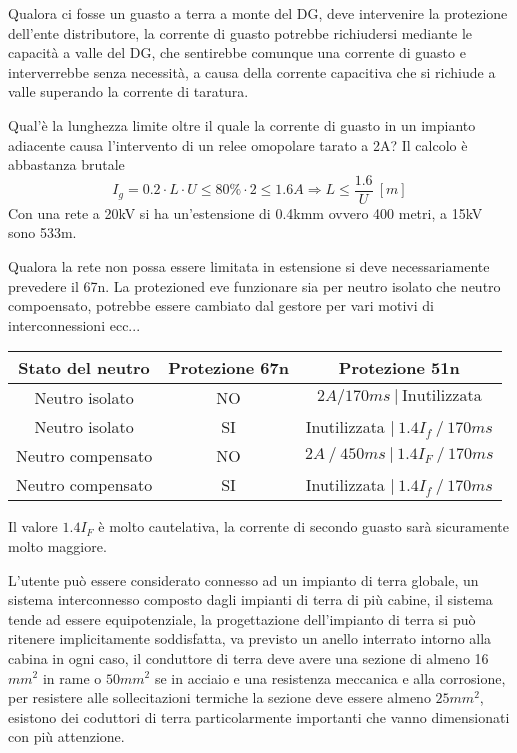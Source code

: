 Qualora ci fosse un guasto a terra a monte del DG, deve intervenire la 
protezione dell'ente distributore, la corrente di guasto potrebbe richiudersi 
mediante le capacità a valle del DG, che sentirebbe comunque una corrente di 
guasto e interverrebbe senza necessità, a causa della corrente capacitiva che 
si richiude a valle superando la corrente di taratura.

Qual'è la lunghezza limite oltre il quale la corrente di guasto in un impianto adiacente causa l'intervento di un relee omopolare tarato a 2A?
Il calcolo è abbastanza brutale
$$
I_g = 0.2\cdot L\cdot U \leq 80\% \cdot 2 \leq 1.6 A \Rightarrow L \leq \frac{1.6}{U}\ [m]
$$
Con una rete a 20kV si ha un'estensione di 0.4kmm ovvero 400 metri, a 15kV sono 533m.

Qualora la rete non possa essere limitata in estensione si deve necessariamente prevedere il 67n. La protezioned eve funzionare sia per neutro isolato che neutro compoensato, potrebbe essere cambiato dal gestore per vari motivi di interconnessioni ecc...
\begin{table}[h]\centering
    \begin{tabular}{|c|c|c|}\hline
        Stato del neutro & Protezione 67n & Protezione 51n \\ \hline
        Neutro isolato & NO  & $2A/170ms\ |\ \text{Inutilizzata}$ \\ \hline
        Neutro isolato & SI & Inutilizzata $|\  1.4I_f\ /\ 170ms $ \\ \hline  
        Neutro compensato & NO &  $2A\ /\ 450ms \ |\ 1.4I_F\ /\ 170ms $\\ \hline
        Neutro compensato & SI & Inutilizzata $|\ 1.4I_f\ /\ 170ms$ \\ \hline
    \end{tabular}
\end{table}
Il valore $1.4 I_F$ è molto cautelativa, la corrente di secondo guasto sarà sicuramente molto maggiore.

L'utente può essere considerato connesso ad un impianto di terra globale, un 
sistema interconnesso composto dagli impianti di terra di più cabine, il 
sistema tende ad essere equipotenziale, la progettazione dell'impianto di terra 
si può ritenere implicitamente soddisfatta, va previsto un anello interrato 
intorno alla cabina in ogni caso, il conduttore di terra deve avere una sezione 
di almeno 16$mm^2$ in rame o $50mm^2$ se in acciaio e una resistenza meccanica 
e alla corrosione, per resistere alle sollecitazioni termiche la sezione deve 
essere almeno $25mm^2$, esistono dei coduttori di terra particolarmente 
importanti che vanno dimensionati con più attenzione.

